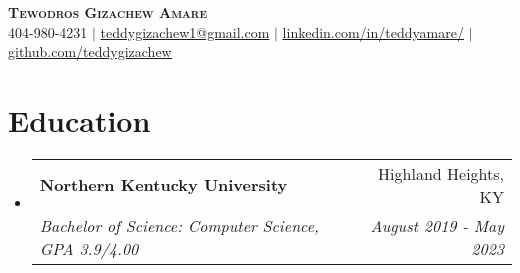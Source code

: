 \documentclass[letterpaper,11pt]{article}
\makeatletter
\newcommand{\resumeSubheading}[4]{
  \vspace{-2pt}\item
    \begin{tabular*}{0.97\textwidth}[t]{l@{\extracolsep{\fill}}r}
      \textbf{#1} & #2 \\
      \textit{\small#3} & \textit{\small #4} \\
    \end{tabular*}\vspace{-9pt}
}
\newcommand{\resumeSubHeadingListStart}{\begin{itemize}[leftmargin=0.15in, label={}]}
\newcommand{\resumeSubHeadingListEnd}{\end{itemize}}
\makeatother
\begin{document}


\begin{center}
    \textbf{\Large \scshape Tewodros Gizachew Amare} \\ \vspace{1pt}
    \small 404-980-4231 $|$ \href{mailto:teddygizachew1@gmail.com}{teddygizachew1@gmail.com} $|$ 
    \href{https://www.linkedin.com/in/teddyamare/}{\underline{linkedin.com/in/teddyamare/}} $|$
    \href{https://github.com/teddygizachew}{\underline{github.com/teddygizachew}}
\end{center}

\section{Education}
  \resumeSubHeadingListStart
    \resumeSubheading
      {Northern Kentucky University}{Highland Heights, KY}
      {Bachelor of Science: Computer Science, GPA 3.9/4.00}{August 2019 - May 2023}
  \resumeSubHeadingListEnd
\end{document}
